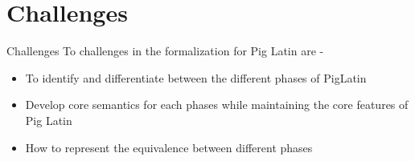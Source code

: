 \section{Challenges}

\begin{frame}{Challenges}
To challenges in the formalization for Pig Latin are -
\begin{itemize}
	\item To identify and differentiate between the different phases of PigLatin
	\item Develop core semantics for each phases while maintaining the core features of Pig Latin
	\item How to represent the equivalence between different phases
\end{itemize}
\end{frame}
